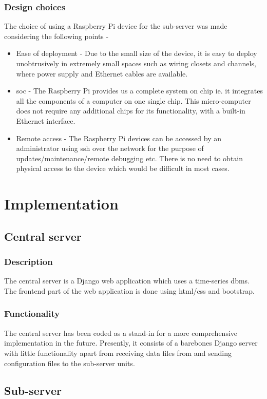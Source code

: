 \documentclass[letterpaper,11pt]{report}
\begin{document}
\subsection{Design choices}
The choice of using a Raspberry Pi device for the sub-server was made considering the following points -
\begin{itemize}
    \item Ease of deployment - Due to the small size of the device, it is easy to deploy unobtrusively in extremely small spaces such as wiring closets and channels, where power supply and Ethernet cables are available.
    \item \ac{soc} - The Raspberry Pi provides us a complete system on chip ie. it integrates all the components of a computer on one single chip. This micro-computer does not require any additional chips for its functionality, with a built-in Ethernet interface.
    \item Remote access - The Raspberry Pi devices can be accessed by an administrator using \ac{ssh} over the network for the purpose of updates/maintenance/remote debugging etc. There is no need to obtain physical access to the device which would be difficult in most cases.
\end{itemize}

\newpage
\chapter{Implementation}\label{chapter:Implementation}
\onehalfspacing
\section{Central server}
\subsection{Description}
The central server is a Django web application which uses a time-series \ac{dbms}. The frontend part of the web application is done using \ac{html}/\ac{css} and bootstrap.
\subsection{Functionality}
The central server has been coded as a stand-in for a more comprehensive implementation in the future. Presently, it consists of a barebones Django server with little functionality apart from receiving data files from  and sending configuration files to the sub-server units.
\section{Sub-server}
\end{document}
